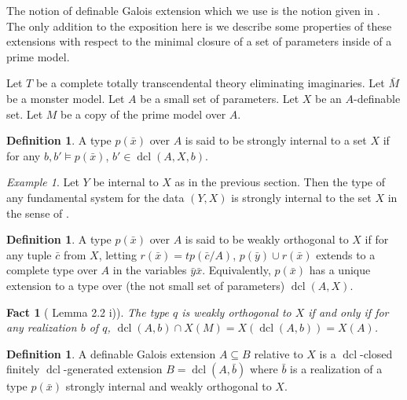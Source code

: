 \documentclass{amsart}
\newtheorem{fact}[theorem]{Fact}
\theoremstyle{definition}
\newtheorem{definition}[theorem]{Definition}
\theoremstyle{remark}
\newtheorem{example}[theorem]{Example}
\numberwithin{equation}{section}
\def \tp {tp}
\def \dcl {\operatorname{dcl}}
\begin{document}
The notion of definable Galois extension which we use is the notion given in \cite{OmarAnand}. The only addition to the exposition here is we describe some properties of these extensions with respect to the minimal closure of a set of parameters inside of a prime model.

Let $T$ be a complete totally transcendental theory eliminating imaginaries. Let $\bar{M}$ be a monster model. Let $A$ be a small set of parameters. Let $X$ be an $A$-definable set. Let $M$ be a copy of the prime model over $A$.

\begin{definition}\cite{OmarAnand}
    A type $p(\bar{x})$ over $A$ is said to be strongly internal to a set $X$ if for any $b,b' \models p(\bar{x})$, $b' \in \dcl(A,X,b)$.
\end{definition}

\begin{example}\label{fund sys Y}
Let $Y$ be internal to $X$ as in the previous section. Then the type of any fundamental system for the data $(Y,X)$ is strongly internal to the set $X$ in the sense of \cite{OmarAnand}. 
\end{example}

\begin{definition}\cite{OmarAnand}\label{def: definable Galois extension}
    A type $p(\bar{x})$ over $A$ is said to be weakly orthogonal to $X$ if for any tuple $\bar{c}$ from $X$, letting $r(\bar{x}) = \tp(\bar{c}/A)$, $p(\bar{y})\cup r(\bar{x})$ extends to a complete type over $A$ in the variables $\bar{y}\bar{x}$. Equivalently, $p(\bar{x})$ has a unique extension to a type over (the not small set of parameters) $\dcl(A,X)$.
\end{definition}

\begin{fact}[\cite{OmarAnand} Lemma 2.2 i)]\label{weak orth fact}
    The type $q$ is weakly orthogonal to $X$ if and only if for any realization $b$ of $q$, $\dcl(A,b) \cap X(M)=X(\dcl(A,b))=X(A)$.
\end{fact}

\begin{definition}\cite{OmarAnand}\label{def: def gal ext}
    A definable Galois extension $A\subseteq B$ relative to $X$ is a $\dcl$-closed finitely $\dcl$-generated extension $B = \dcl(A,\bar{b})$ where $\bar{b}$ is a realization of a type $p(\bar{x})$ strongly internal and weakly orthogonal to $X$.
\end{definition}
\end{document}
